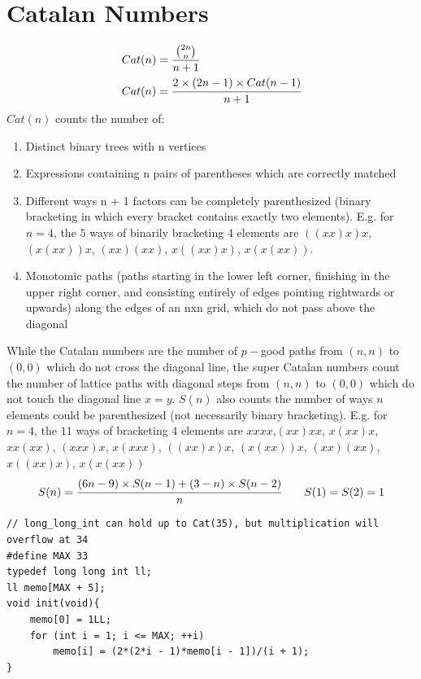 \documentclass[12pt]{book}
\begin{document}
\section{Catalan Numbers}
\begin{align*}
Cat(n) &= \cfrac{{2n \choose n}}{n + 1}
\\
Cat(n) &= \cfrac{2 \times (2n - 1)\times Cat(n - 1)}{n + 1}
\\
\end{align*}
$Cat(n)$ counts the number of:
\begin{enumerate}
\item Distinct binary trees with n vertices
\item Expressions containing n pairs of parentheses which are correctly matched
\item Different ways n + 1 factors can be completely parenthesized (binary bracketing in which every bracket contains exactly two elements). E.g. for $n=4$, the $5$ ways of binarily bracketing $4$ elements are $((xx)x)x$, $(x(xx))x$, $(xx)(xx)$, $x((xx)x)$, $x(x(xx))$.
\item Monotomic paths (paths starting in the lower left corner, finishing in the upper right corner, and consisting entirely of edges pointing rightwards or upwards) along the edges of an nxn grid, which do not pass above the diagonal
\end{enumerate}
While the Catalan numbers are the number of $p-$good paths from $(n,n)$ to $(0,0)$ which do not cross the diagonal line, the super Catalan numbers count the number of lattice paths with diagonal steps from $(n,n)$ to $(0,0)$ which do not touch the diagonal line $x=y$. $S(n)$ also counts the number of ways $n$ elements could be parenthesized (not necessarily binary bracketing). E.g. for $n = 4$, the $11$ ways of bracketing $4$ elements are $xxxx$,$(xx)xx$, $x(xx)x$, $xx(xx)$, $(xxx)x$, $x(xxx)$, $((xx)x)x$, $(x(xx))x$, $(xx)(xx)$, $x((xx)x)$, $x(x(xx))$
\begin{align*}
S(n) = \cfrac{(6n - 9)\times S(n-1) + (3-n)\times S(n-2)}{n}\quad\quad S(1) = S(2) = 1
\end{align*}
\begin{verbatim}
// long_long_int can hold up to Cat(35), but multiplication will overflow at 34
#define MAX 33
typedef long long int ll;
ll memo[MAX + 5];
void init(void){
	memo[0] = 1LL;
	for (int i = 1; i <= MAX; ++i)
		memo[i] = (2*(2*i - 1)*memo[i - 1])/(i + 1);
}
\end{verbatim}
\end{document}
